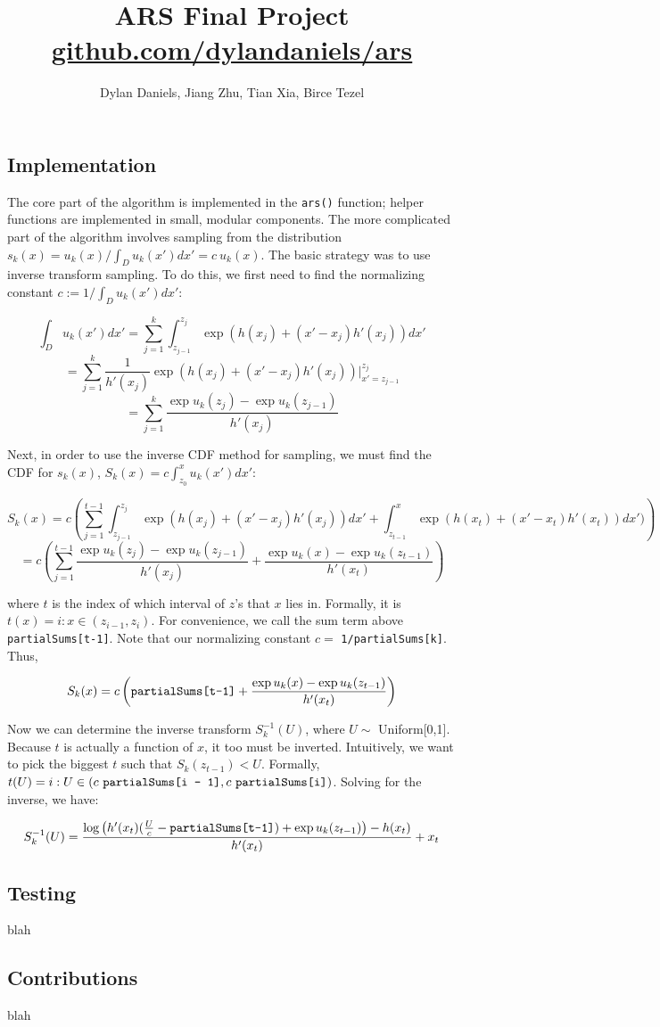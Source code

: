 \documentclass{article}\usepackage[]{graphicx}\usepackage[]{color}
\author{Dylan Daniels, Jiang Zhu, Tian Xia, Birce Tezel}
\title{ARS Final Project \\ \url{github.com/dylandaniels/ars}}
\begin{document}
\maketitle

\subsection*{Implementation}
The core part of the algorithm is implemented in the \texttt{ars()} function; helper functions are implemented in small, modular components. The more complicated part of the algorithm involves sampling from the distribution $s_k(x) = u_k(x) / \int_D u_k(x') dx' = c \ u_k(x)$. The basic strategy was to use inverse transform sampling. To do this, we first need to find the normalizing constant $c := 1 / \int_D u_k(x') dx':$


$$
\int_D u_k(x') dx' = \sum_{j = 1}^k \int_{z_{j-1}}^{z_j} \exp(h(x_j) + (x' - x_j) h'(x_j)) dx'
$$
$$
 = \sum_{j = 1}^k \frac{1}{h'(x_j)} \exp(h(x_j) + (x' - x_j) h'(x_j)) \bigg\rvert^{z_j}_{x' = z_{j - 1}}
$$
$$
 = \sum_{j = 1}^k \frac{\exp u_k(z_j)  - \exp u_k(z_{j-1}) }{h'(x_j)}
$$

Next, in order to use the inverse CDF method for sampling, we must find the CDF for $s_k(x)$, $S_k(x) = c \int_{z_0}^x u_k(x') dx'$:

$$
S_k(x) = c \left(\sum_{j = 1}^{t - 1} \int_{z_{j-1}}^{z_j} \exp(h(x_j) + (x' - x_j) h'(x_j)) dx' + \int_{z_{t-1}}^x \exp(h(x_t) + (x' - x_t) h'(x_t)) dx') \right)
$$
$$
 = c \left( \sum_{j = 1}^{t-1} \frac{\exp u_k(z_j) - \exp u_k(z_{j-1})}{h'(x_j)} + \frac{\exp u_k(x) - \exp u_k(z_{t-1})}{h'(x_t)} \right)
$$

\noindent where $t$ is the index of which interval of $z$'s that $x$ lies in. Formally, it is $t(x) = i : x \in (z_{i-1}, z_i)$. For convenience, we call the sum term above \texttt{partialSums[t-1]}. Note that our normalizing constant $c =$ \texttt{1/partialSums[k]}. Thus,

$$
S_k(x) = c \left(\text{\texttt{partialSums[t-1]}} + \frac{\exp u_k(x) - \exp u_k(z_{t-1})}{h'(x_t)} \right)
$$

Now we can determine the inverse transform $S_k^{-1}(U)$, where $U \sim$ Uniform[0,1]. Because $t$ is actually a function of $x$, it too must be inverted. Intuitively, we want to pick the biggest $t$ such that $S_k(z_{t-1}) < U$. Formally, $t(U) = i : U \in (c\ \text{\texttt{partialSums[i - 1]}}, c\ \text{\texttt{partialSums[i]}})$. Solving for the inverse, we have:

$$
S_k^{-1}(U) = \frac{\log\left(h'(x_t) (\frac{U}{c} - \text{\texttt{partialSums[t-1]}}) + \exp u_k(z_{t-1})\right) - h(x_t)}{h'(x_t)} + x_t
$$

\subsection*{Testing}
blah

\subsection*{Contributions}
blah
\end{document}
